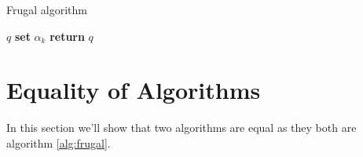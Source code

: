 \documentclass[11pt]{article}
\begin{document}
\begin{algorithm}
\caption{Frugal algorithm}\label{alg:frugal}
    \begin{algorithmic}[1]
                    
         $q$               
                              
                \State \textbf{set} $\alpha_k$  
                                
                \Else                           {}
                \EndIf
            \EndFor\label{frugal_for}
        \State \textbf{return} $q$  
        \EndProcedure
    \end{algorithmic}
\end{algorithm}
\section{Equality of Algorithms}
In this section we'll show that two algorithms are equal as they both are algorithm \ref{alg:frugal}.
\end{document}
